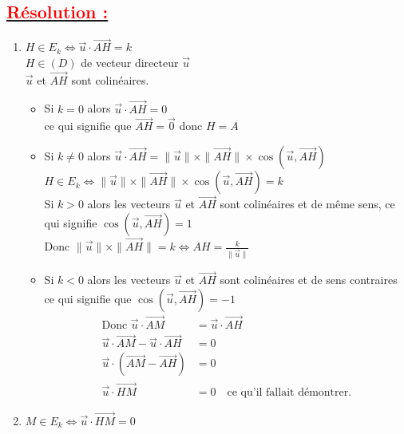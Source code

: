 \documentclass[12pt,a4paper]{article}
\newcounter{solution}
\begin{document}
\subsection*{\underline{\textbf{\textcolor{red}{Résolution :}}}}
\begin{enumerate}
\item 
$H \in E_k \iff \vec{u} \cdot \overrightarrow{AH} = k$ \\
$H \in (D)$ de vecteur directeur $\vec{u}$ \\
$\vec{u}$ et $\overrightarrow{AH}$ sont colinéaires.

\begin{itemize}
    \item Si $k = 0$ alors $\vec{u} \cdot \overrightarrow{AH} = 0$ \\
    ce qui signifie que $\overrightarrow{AH} = \vec{0}$ donc $H = A$

    \item Si $k \neq 0$ alors $\vec{u} \cdot \overrightarrow{AH} = \|\vec{u}\| \times \|\overrightarrow{AH}\| \times \cos(\vec{u}, \overrightarrow{AH})$ \\
    $H \in E_k \iff \|\vec{u}\| \times \|\overrightarrow{AH}\| \times \cos(\vec{u}, \overrightarrow{AH}) = k$ \\
    Si $k > 0$ alors les vecteurs $\vec{u}$ et $\overrightarrow{AH}$ sont colinéaires et de même sens, ce qui signifie $\cos(\vec{u}, \overrightarrow{AH}) = 1$ \\
    Donc $\|\vec{u}\| \times \|\overrightarrow{AH}\| = k \iff AH = \frac{k}{\|\vec{u}\|}$

    \item Si $k < 0$ alors les vecteurs $\vec{u}$ et $\overrightarrow{AH}$ sont colinéaires et de sens contraires ce qui signifie que $\cos(\vec{u}, \overrightarrow{AH}) = -1$ \\

    
\begin{align*}
\text{Donc } \vec{u} \cdot \overrightarrow{AM} &= \vec{u} \cdot \overrightarrow{AH} \\
\vec{u} \cdot \overrightarrow{AM} - \vec{u} \cdot \overrightarrow{AH} &= 0 \\
\vec{u} \cdot \left(\overrightarrow{AM} - \overrightarrow{AH}\right) &= 0 \\
\vec{u} \cdot \overrightarrow{HM} &= 0 \quad \text{ce qu'il fallait démontrer.}
\end{align*}

\end{itemize}
\item $M \in E_k \iff \vec{u} \cdot \overrightarrow{HM} = 0$
 

\end{enumerate}
\end{document}
